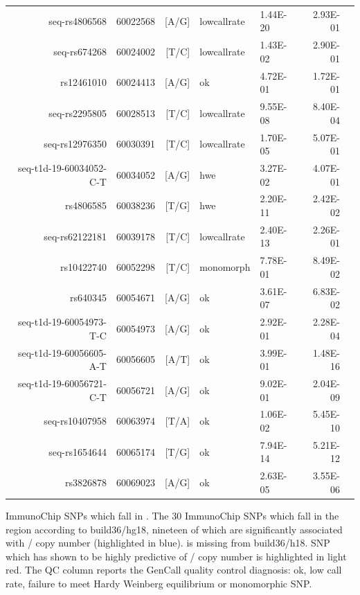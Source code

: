 \begin{table}[h]
\begin{center}
\begin{tabular}{rlrllrr}
\rowcolor{LightCyan}
seq-rs4806568           & 60022568 & [A/G] & lowcallrate & 1.44E-20 & 2.93E-01 \\
seq-rs674268            & 60024002 & [T/C] & lowcallrate & 1.43E-02 & 2.90E-01 \\
rs12461010              & 60024413 & [A/G] & ok          & 4.72E-01 & 1.72E-01 \\
\rowcolor{LightCyan}
seq-rs2295805           & 60028513 & [T/C] & lowcallrate & 9.55E-08 & 8.40E-04 \\
seq-rs12976350          & 60030391 & [T/C] & lowcallrate & 1.70E-05 & 5.07E-01 \\
seq-t1d-19-60034052-C-T & 60034052 & [A/G] & hwe         & 3.27E-02 & 4.07E-01 \\
\rowcolor{LightCyan}
rs4806585               & 60038236 & [T/G] & hwe         & 2.20E-11 & 2.42E-02 \\
\rowcolor{LightCyan}
seq-rs62122181          & 60039178 & [T/C] & lowcallrate & 2.40E-13 & 2.26E-01 \\
rs10422740              & 60052298 & [T/C] & monomorph   & 7.78E-01 & 8.49E-02 \\
\rowcolor{LightCyan}
rs640345                & 60054671 & [A/G] & ok          & 3.61E-07 & 6.83E-02 \\
seq-t1d-19-60054973-T-C & 60054973 & [A/G] & ok          & 2.92E-01 & 2.28E-04 \\
\rowcolor{LightCyan}
seq-t1d-19-60056605-A-T & 60056605 & [A/T] & ok          & 3.99E-01 & 1.48E-16 \\
\rowcolor{LightCyan}
seq-t1d-19-60056721-C-T & 60056721 & [A/G] & ok          & 9.02E-01 & 2.04E-09 \\
\rowcolor{LightCyan}
seq-rs10407958          & 60063974 & [T/A] & ok          & 1.06E-02 & 5.45E-10 \\
\rowcolor{LightCyan}
seq-rs1654644           & 60065174 & [T/G] & ok          & 7.94E-14 & 5.21E-12 \\
\rowcolor{LightCyan}
rs3826878               & 60069023 & [A/G] & ok          & 2.63E-05 & 3.55E-06 \\
   \hline
\end{tabular}
\end{center}
    {ImmunoChip SNPs which fall in .}
    {
    The 30 ImmunoChip SNPs which fall in the  region according to build36/hg18, nineteen of which
    are significantly associated with / copy number (highlighted in blue).
     is missing from build36/h18.
    SNP  which has shown to be highly predictive of / copy number is
    highlighted in light red.
    The QC column reports the GenCall quality control diagnosis: ok, low call rate, failure to meet Hardy Weinberg equilibrium or
    monomorphic SNP.
    }
\end{table}


